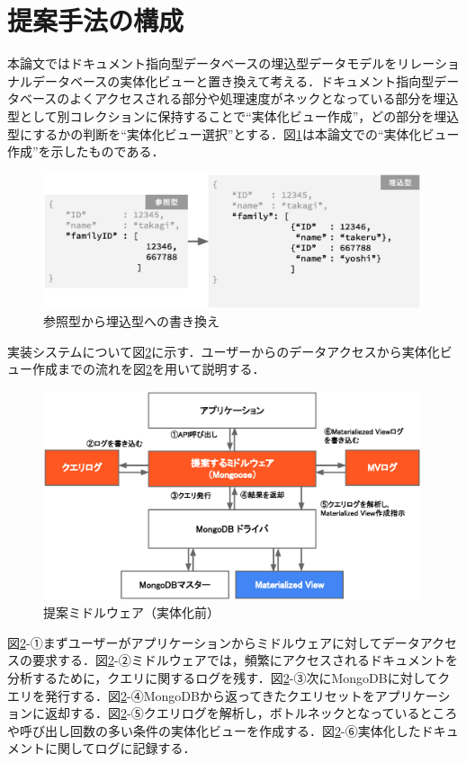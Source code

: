 \documentclass[a4paper,11pt]{ujreport}
\begin{document}
\section{提案手法の構成}
本論文ではドキュメント指向型データベースの埋込型データモデルをリレーショナルデータベースの実体化ビューと置き換えて考える．ドキュメント指向型データベースのよくアクセスされる部分や処理速度がネックとなっている部分を埋込型として別コレクションに保持することで“実体化ビュー作成”，どの部分を埋込型にするかの判断を“実体化ビュー選択”とする．図\ref{figure:ReferenceToEmbed}は本論文での“実体化ビュー作成”を示したものである．
\begin{figure}[htbp]
	\begin{center}
		\includegraphics[width=30em, trim=0 13em 0 0]{src/ReferenceToEmbed.eps} %
	\end{center}
	\caption{参照型から埋込型への書き換え}
	\label{figure:ReferenceToEmbed}
\end{figure}

実装システムについて図\ref{figure:Midleware}に示す．ユーザーからのデータアクセスから実体化ビュー作成までの流れを図\ref{figure:Midleware}を用いて説明する．
\begin{figure}[h]
	\begin{center}
		\includegraphics[width=30em]{src/Midleware.eps}
	\end{center}
	\caption{提案ミドルウェア（実体化前）}
	\label{figure:Midleware}
\end{figure}
図\ref{figure:Midleware}-①まずユーザーがアプリケーションからミドルウェアに対してデータアクセスの要求する．図\ref{figure:Midleware}-②ミドルウェアでは，頻繁にアクセスされるドキュメントを分析するために，クエリに関するログを残す．図\ref{figure:Midleware}-③次にMongoDBに対してクエリを発行する．図\ref{figure:Midleware}-④MongoDBから返ってきたクエリセットをアプリケーションに返却する．図\ref{figure:Midleware}-⑤クエリログを解析し，ボトルネックとなっているところや呼び出し回数の多い条件の実体化ビューを作成する．図\ref{figure:Midleware}-⑥実体化したドキュメントに関してログに記録する．
\end{document}
